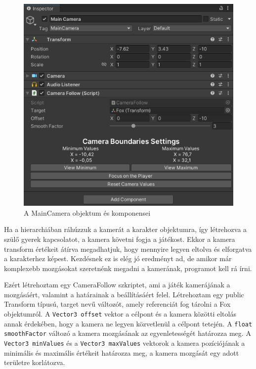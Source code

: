 \begin{figure}[ht]
\centering
\includegraphics[scale = 0.4]{images/maincameracomponents.png}
\caption{A MainCamera objektum és komponensei}
\label{fig:maincamera}
\end{figure}

Ha a hierarchiában ráhúzzuk a kamerát a karakter objektumra, így létrehozva a szülő gyerek kapcsolatot, a kamera követni fogja a játékost. Ekkor a kamera transform értékeit átírva megadhatjuk, hogy mennyire legyen eltolva és elforgatva a karakterhez képest. Kezdésnek ez is elég jó eredményt ad, de amikor már komplexebb mozgásokat szeretnénk megadni a kamerának, programot kell rá írni.

Ezért létrehoztam egy CameraFollow szkriptet, ami a játék kamerájának a mozgásáért, valamint a határainak a beállításáért felel. Létrehoztam egy public Transform típusú, target nevű változót, amely referenciát fog tárolni a Fox objektumról. A \texttt{Vector3 offset} vektor a célpont és a kamera közötti eltolás annak érdekében, hogy a kamera ne legyen közvetlenül a célpont tetején. A \texttt{float smoothFactor} változó a kamera mozgásának az egyenletességét határozza meg. A \texttt{Vector3 minValues} és a \texttt{Vector3 maxValues} vektorok a kamera pozíciójának a minimális és maximális értékeit határozza meg, a kamera mozgását egy adott területre korlátozva. 

